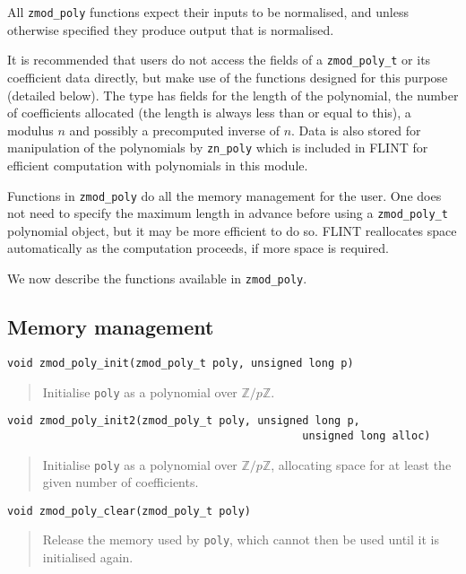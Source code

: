 \documentclass[a4paper,10pt]{article}
\newcommand{\Z}{\mathbb{Z}}
\newcommand{\code}{\lstinline}
\begin{document}
All \code{zmod_poly} functions expect their inputs to be normalised, and unless otherwise specified they produce output that is normalised. 

It is recommended that users do not access the fields of a \code{zmod_poly_t} or its coefficient data directly, but make use of the functions designed for this purpose (detailed below). The type has fields for the length of the polynomial, the number of coefficients allocated (the length is always less than or equal to this), a modulus $n$ and possibly a precomputed inverse of $n$. Data is also stored for manipulation of the polynomials by \code{zn_poly} which is included in FLINT for efficient computation with polynomials in this module.

Functions in \code{zmod_poly} do all the memory management for the user. One does not need to specify the maximum length in advance before using a \code{zmod_poly_t} polynomial object, but it may be more efficient to do so. FLINT reallocates space automatically as the computation proceeds, if more space is required. 

We now describe the functions available in \code{zmod_poly}.

\subsection{Memory management}

\begin{lstlisting}
void zmod_poly_init(zmod_poly_t poly, unsigned long p)
\end{lstlisting}
\begin{quote}
Initialise \code{poly} as a polynomial over $\Z/p\Z$. 
\end{quote}

\begin{lstlisting}
void zmod_poly_init2(zmod_poly_t poly, unsigned long p, 
                                              unsigned long alloc)
\end{lstlisting}
\begin{quote}
Initialise \code{poly} as a polynomial over $\Z/p\Z$, allocating space for at least the given number of coefficients. 
\end{quote}

\begin{lstlisting}
void zmod_poly_clear(zmod_poly_t poly)
\end{lstlisting}
\begin{quote}
Release the memory used by \code{poly}, which cannot then be used until it is initialised again.
\end{quote}
\end{document}
